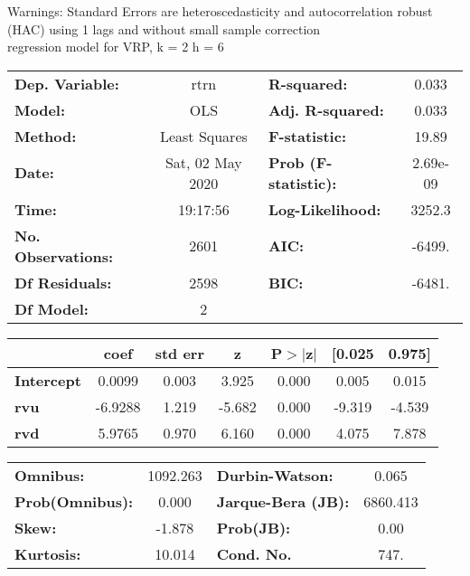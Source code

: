 Warnings: \newline
 [1] Standard Errors are heteroscedasticity and autocorrelation robust (HAC) using 1 lags and without small sample correction\\ 

regression model for VRP, k = 2 h = 6\begin{center}
\begin{tabular}{lclc}
\toprule
\textbf{Dep. Variable:}    &       rtrn       & \textbf{  R-squared:         } &     0.033   \\
\textbf{Model:}            &       OLS        & \textbf{  Adj. R-squared:    } &     0.033   \\
\textbf{Method:}           &  Least Squares   & \textbf{  F-statistic:       } &     19.89   \\
\textbf{Date:}             & Sat, 02 May 2020 & \textbf{  Prob (F-statistic):} &  2.69e-09   \\
\textbf{Time:}             &     19:17:56     & \textbf{  Log-Likelihood:    } &    3252.3   \\
\textbf{No. Observations:} &        2601      & \textbf{  AIC:               } &    -6499.   \\
\textbf{Df Residuals:}     &        2598      & \textbf{  BIC:               } &    -6481.   \\
\textbf{Df Model:}         &           2      & \textbf{                     } &             \\
\bottomrule
\end{tabular}
\begin{tabular}{lcccccc}
                   & \textbf{coef} & \textbf{std err} & \textbf{z} & \textbf{P$> |$z$|$} & \textbf{[0.025} & \textbf{0.975]}  \\
\midrule
\textbf{Intercept} &       0.0099  &        0.003     &     3.925  &         0.000        &        0.005    &        0.015     \\
\textbf{rvu}       &      -6.9288  &        1.219     &    -5.682  &         0.000        &       -9.319    &       -4.539     \\
\textbf{rvd}       &       5.9765  &        0.970     &     6.160  &         0.000        &        4.075    &        7.878     \\
\bottomrule
\end{tabular}
\begin{tabular}{lclc}
\textbf{Omnibus:}       & 1092.263 & \textbf{  Durbin-Watson:     } &    0.065  \\
\textbf{Prob(Omnibus):} &   0.000  & \textbf{  Jarque-Bera (JB):  } & 6860.413  \\
\textbf{Skew:}          &  -1.878  & \textbf{  Prob(JB):          } &     0.00  \\
\textbf{Kurtosis:}      &  10.014  & \textbf{  Cond. No.          } &     747.  \\
\bottomrule
\end{tabular}
\end{center}

